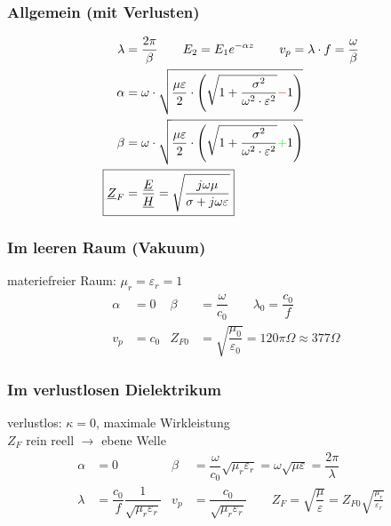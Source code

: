 \subsubsection{Allgemein (mit Verlusten)}
\begin{align*}
    \lambda                 & = \dfrac{2\pi}{\beta} \qquad E_2 = E_1 e^{-\alpha z}         \qquad                                                                            
    v_p                      = \lambda\cdot f = \dfrac{\omega}{\beta}                                                                                                    \\
    \alpha                  & = \omega \cdot \sqrt{\dfrac{\mu \varepsilon}{2}\cdot \left(\sqrt{1+\dfrac{\sigma^2}{\omega^2\cdot\varepsilon^2}}{\color{red}{-}}1\right)}   \\
    \beta                   & = \omega \cdot \sqrt{\dfrac{\mu \varepsilon}{2}\cdot \left(\sqrt{1+\dfrac{\sigma^2}{\omega^2\cdot\varepsilon^2}}{\color{green}{+}}1\right)} \\
    \Aboxed{\underline{Z}_F & = \dfrac{\underline{E}}{\underline{H}} = \sqrt{\dfrac{j\omega\mu}{\sigma+j\omega\varepsilon}}}
\end{align*}

\subsubsection{Im leeren Raum (Vakuum)}
materiefreier Raum: $ \mu_r = \varepsilon_r = 1 $
\begin{align*}
    \alpha                     & = 0 &
    \beta                      & = \dfrac{\omega}{c_0} \qquad 
    \lambda_0                   = \dfrac{c_0}{f} \\
    v_p                        & = c_0 &
Z_{F0} & = \sqrt{\dfrac{\mu_0}{\varepsilon_0}} = 120 \pi\Omega\approx377\Omega &
\end{align*}
\subsubsection{Im verlustlosen Dielektrikum}
verlustlos: $\kappa =0$, maximale Wirkleistung\\
$Z_F$ rein reell $\rightarrow$ ebene Welle
\begin{align*}
    \alpha                  & = 0 &
    \beta                   & = \dfrac{\omega}{c_0}\sqrt{\mu_r\varepsilon_r}=\omega\sqrt{\mu\varepsilon}=\dfrac{2\pi}{\lambda} \\
    \lambda                 & = \dfrac{c_0}{f}\dfrac{1}{\sqrt{\mu_r\varepsilon_r}} &
    v_p                     & = \dfrac{c_0}{\sqrt{\mu_r\varepsilon_r}}         \qquad
    \boxed{Z_F = \sqrt{\dfrac{\mu}{\varepsilon}}=Z_{F0}\sqrt{\frac{\mu_r}{\varepsilon_r}}}
\end{align*}

